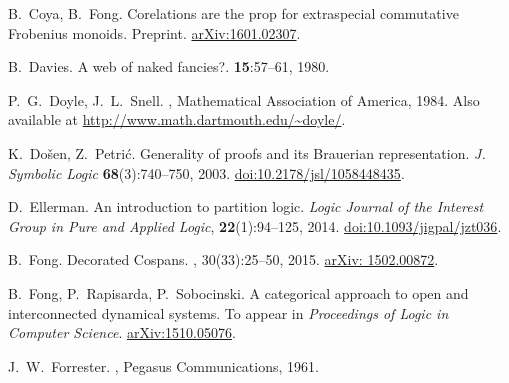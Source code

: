 \begin{thebibliography}{RSW00}
    B.\ Coya, B.\ Fong.
    \newblock Corelations are the prop for extraspecial commutative Frobenius
    monoids.
    \newblock Preprint.
    \newblock \href{http://arxiv.org/abs/1601.02307}{arXiv:1601.02307}.

    B.\ Davies.
    \newblock A web of naked fancies?.
     {\bf 15}:57--61, 1980.

    P.\ G.\ Doyle, J.\ L.\ Snell.
    , Mathematical Association of America, 1984.
    \newblock Also available at \href{http://www.math.dartmouth.edu/~doyle/}
    {http://www.math.dartmouth.edu/\~{}doyle/}.

    K.\ Do\v{s}en, Z.\ Petri\'c.
    \newblock Generality of proofs and its Brauerian representation.
    \newblock \textsl{J. Symbolic Logic} {\bf 68}(3):740--750, 2003.
    \newblock
    \href{http://doi.org/10.2178/jsl/1058448435}{doi:10.2178/jsl/1058448435}.

  D.\ Ellerman.
  \newblock An introduction to partition logic.
  \newblock \textsl{Logic Journal of the Interest Group in Pure and Applied
  Logic}, {\bf 22}(1):94--125, 2014.
  \newblock
  \href{http://doi.org/10.1093/jigpal/jzt036}{doi:10.1093/jigpal/jzt036}.


    B.\ Fong.
    \newblock Decorated Cospans.
    , 30(33):25--50, 2015.
    \newblock \href{http://arxiv.org/abs/1502.00872}{arXiv: 1502.00872}.

    B.\ Fong, P.\ Rapisarda, P.\ Sobocinski.
    \newblock A categorical approach to open and interconnected dynamical
    systems.
    \newblock To appear in {\sl Proceedings of Logic in Computer Science}.
    \newblock \href{http://arxiv.org/abs/1510.05076}{arXiv:1510.05076}.

    J.\ W.\ Forrester.
    , Pegasus Communications, 1961. 



\end{thebibliography}
